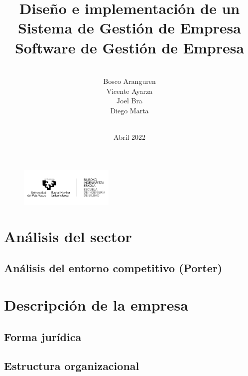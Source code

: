 \documentclass[12pt, letterpaper]{article}
\title{\textsf{\textbf{\Huge Diseño e implementación de un Sistema de Gestión de Empresa}\\ \large \textbf{Software de Gestión de Empresa}}}
\author{\vspace{70px} \\\textsf{Bosco Aranguren} \\ \textsf{Vicente Ayarza} \\ \textsf{Joel Bra} \\ \textsf{Diego Marta}}
\date{\textsf{\vspace{40px} \\ Abril 2022}}
\begin{document}
\maketitle
{}

\begin{figure}[b]
\centering
\includegraphics[width=170px]{logo.png}
\end{figure}

\sffamily
\thispagestyle{empty}
\clearpage
\tableofcontents
\clearpage
\section{\textsf{Análisis del sector}}

\subsection{\textsf{Análisis del entorno competitivo (Porter)}}

\clearpage
\section{\textsf{Descripción de la empresa}}
\subsection{\textsf{Forma jurídica}}

\subsection{\textsf{Estructura organizacional}}

\clearpage
\listoffigures
\clearpage

\end{document}
